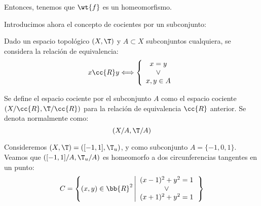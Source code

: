 \begin{ejemplo}
\begin{enumerate}
        Entonces, tenemos que $\wt{f}$ es un homeomorfismo.
    \end{enumerate}
    
    Introducimos ahora el concepto de cocientes por un subconjunto:
    \begin{definicion}
        Dado un espacio topológico $(X,\T)$ y $A\subset X$ subconjuntos cualquiera, se considera la relación de equivalencia:
        \begin{equation*}
            x\cc{R}y \Longleftrightarrow \left\{
            \begin{array}{c}
                x=y \\ \lor \\ x,y\in A
            \end{array}
            \right.
        \end{equation*}

        Se define el espacio cociente por el subconjunto $A$ como el espacio cociente $(X/\cc{R}, \T/\cc{R})$ para la relación de equivalencia $\cc{R}$ anterior.
        Se denota normalmente como:
        \begin{equation*}
            (X/A,\T/A)
        \end{equation*}
    \end{definicion}
    \begin{ejemplo}
        Consideremos $(X,\T)=([-1,1],\T_u)$, y como subconjunto $A=\{-1,0,1\}$. Veamos que $([-1,1]/A,\T_u/A)$ es homeomorfo a dos circunferencias tangentes en un punto:
        \begin{equation*}
            C = \left\{(x,y)\in \bb{R}^2\left|
                \begin{array}{c}
                    (x-1)^2 + y^2=1 \\ \lor \\
                    (x+1)^2 + y^2 = 1
                \end{array}
            \right.\right\}
        \end{equation*}
        \begin{figure}[H]
            \centering
\end{figure}
\end{ejemplo}
\end{ejemplo}
